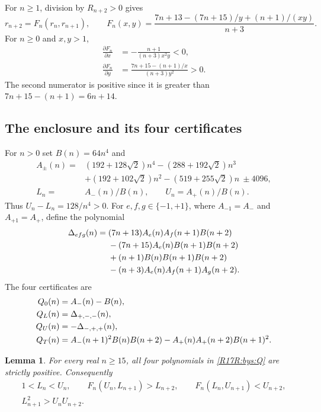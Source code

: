 \documentclass[11pt,a4paper]{article}
\newtheorem{SourceRbhRlemma}[SourceRbhRtheorem]{Lemma}
\begin{document}
For $n\ge1$, division by $R_{n+2}>0$ gives
\begin{equation}\label{R17R:bys:update}
 r_{n+2}=F_n(r_n,r_{n+1}),\qquad
 F_n(x,y)=\frac{7n+13-(7n+15)/y+(n+1)/(xy)}{n+3}.
\end{equation}
For $n\ge0$ and $x,y>1$,
\begin{align*}
 \frac{\partial F_n}{\partial x}
   &=-\frac{n+1}{(n+3)x^2y}<0,\\
 \frac{\partial F_n}{\partial y}
   &=\frac{7n+15-(n+1)/x}{(n+3)y^2}>0.
\end{align*}
The second numerator is positive since it is greater than
$7n+15-(n+1)=6n+14$.

\subsection{The enclosure and its four certificates}
For $n>0$ set $B(n)=64n^4$ and
\begin{align*}
 A_\pm(n)={}&(192+128\sqrt2)n^4-(288+192\sqrt2)n^3\\
 &+(192+102\sqrt2)n^2-(519+255\sqrt2)n\ \pm4096,\\
 L_n={}&A_-(n)/B(n),\qquad U_n=A_+(n)/B(n).
\end{align*}
Thus $U_n-L_n=128/n^4>0$.
For $e,f,g\in\{-1,+1\}$, where $A_{-1}=A_-$ and
$A_{+1}=A_+$, define the polynomial
\begin{align}
 \Delta_{efg}(n)={}&(7n+13)A_e(n)A_f(n+1)B(n+2)\notag\\
 &-(7n+15)A_e(n)B(n+1)B(n+2)\notag\\
 &+(n+1)B(n)B(n+1)B(n+2)\notag\\
 &-(n+3)A_e(n)A_f(n+1)A_g(n+2).
 \label{R17R:bys:Delta}
\end{align}
The four certificates are
\begin{align}
 Q_0(n)&=A_-(n)-B(n),\notag\\
 Q_L(n)&=\Delta_{+,-,-}(n),\notag\\
 Q_U(n)&=-\Delta_{-,+,+}(n),\notag\\
 Q_T(n)&=A_-(n+1)^2B(n)B(n+2)
       -A_+(n)A_+(n+2)B(n+1)^2.\label{R17R:bys:Q}
\end{align}

\begin{SourceRbhRlemma}\label{R17R:bys:cert}
For every real $n\ge15$, all four polynomials in
\eqref{R17R:bys:Q} are strictly positive. Consequently
\begin{align*}
 1<L_n<U_n,\qquad
 F_n(U_n,L_{n+1})>L_{n+2},\qquad
 F_n(L_n,U_{n+1})<U_{n+2},\\
 L_{n+1}^2>U_nU_{n+2}.
\end{align*}
\end{SourceRbhRlemma}
\end{document}
